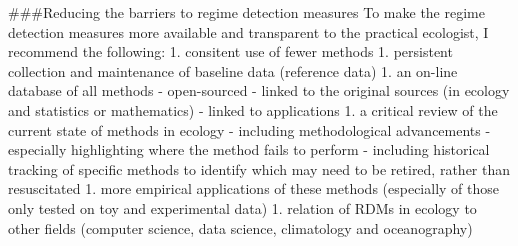 \documentclass[12pt,twoside,openany]{reedthesis}
\begin{document}
\#\#\#Reducing the barriers to regime detection measures
To make the regime detection measures more available and transparent to the practical ecologist, I recommend the following:
1. consitent use of fewer methods
1. persistent collection and maintenance of baseline data (reference data)
1. an on-line database of all methods
- open-sourced
- linked to the original sources (in ecology and statistics or mathematics)
- linked to applications
1. a critical review of the current state of methods in ecology
- including methodological advancements
- especially highlighting where the method fails to perform
- including historical tracking of specific methods to identify which may need to be retired, rather than resuscitated
1. more empirical applications of these methods (especially of those only tested on toy and experimental data)
1. relation of RDMs in ecology to other fields (computer science, data science, climatology and oceanography)
\end{document}
